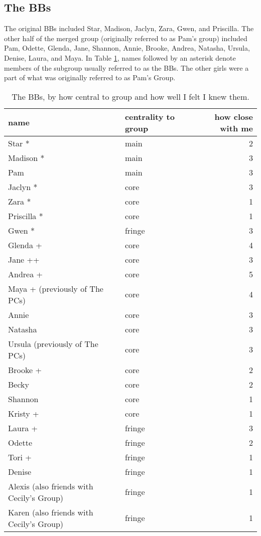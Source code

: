\subsection {The BBs}
\nopagebreak
The original BBs in\-cluded Star, Ma\-di\-son, Ja\-clyn, Za\-ra, Gwen, and Pris\-cil\-la.  The other half of the merged group (originally referred to as Pam's group) included Pam, Odette, Glenda, Jane, Shannon, Annie, Brooke, Andrea, Natasha, Ursula, Denise, Laura, and Maya.  In Table \ref{BBnames}, names followed by an asterisk denote members of the subgroup usually referred to as the BBs.  The other girls were a part of what was originally referred to as Pam's Group.
\nopagebreak
\begin{table}[ht]
\caption{The BBs, by how central to group and how well I felt I knew them.}	\label{BBnames}
	\centering
		\begin{tabular}{llr} \\
		\hline
		
			name & centrality to group & how close with me  \\
			\hline
			
			Star * 		&		main	&		2 \\
			Madison *	&		main	&		3 \\
			Pam			&		main	&		3 \\
			Jaclyn *	&		core	&		3 \\
			Zara *	&		core	&		1 \\
			Priscilla * & core	&		1 \\
			Gwen *		&		fringe &	3 \\
			Glenda +	&		core	&		4 \\
			Jane ++		&		core	&	3 \\
			Andrea + & core & 5 \\
			Maya + (previously of The PCs) & core & 4 \\
			Annie & core & 3 \\
			Natasha & core & 3 \\
			Ursula (previously of The PCs) & core & 3 \\
			Brooke + & core & 2 \\
			Becky & core & 2 \\
			Shannon	&	core	& 1 \\
			Kristy + & core & 1 \\
			Laura + & fringe & 3 \\
			Odette	&		fringe	&	2 \\
			Tori  +  & fringe  & 1 \\
			Denise & fringe & 1 \\
			Alexis (also friends with Cecily's Group) & fringe & 1 \\
			Karen (also friends with Cecily's Group) & fringe & 1 \\
			   \hline
		\end{tabular}
\end{table}


